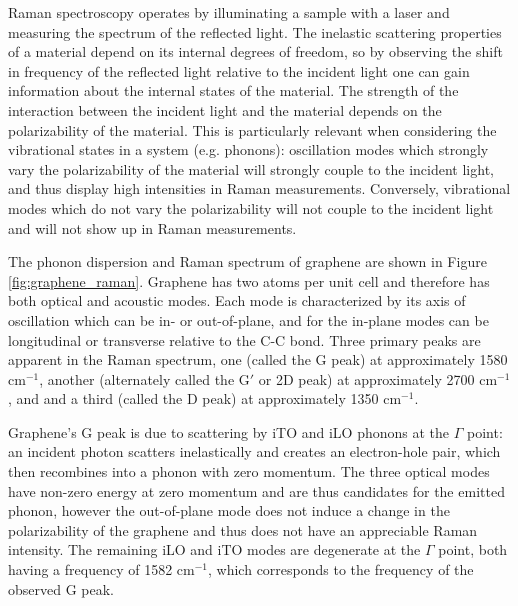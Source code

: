 \documentclass[edeposit,fullpage,draftthesis]{uiucthesis2009}
\begin{document}
        Raman spectroscopy operates by illuminating a sample with a laser and measuring the spectrum
        of the reflected light. The inelastic scattering properties of a material depend on its
        internal degrees of freedom, so by 
        observing the shift in frequency of the reflected light relative to the incident light one can
        gain information about the internal states of the material. 
        The strength of the interaction between the incident light and the material depends on the polarizability
        of the material. This is particularly relevant when considering the vibrational states in 
        a system (e.g. phonons): oscillation modes which strongly vary the polarizability of the material
        will strongly couple to the incident light, and thus display high intensities in Raman measurements.
        Conversely, vibrational modes which do not vary the polarizability will not couple to the incident
        light and will not show up in Raman measurements.
        
        The phonon dispersion and Raman spectrum of graphene are shown in Figure \ref{fig:graphene_raman}. 
        Graphene has two atoms per unit cell and therefore has both optical and acoustic modes. Each mode
        is characterized by its axis of oscillation which can be in- or out-of-plane, and for the in-plane 
        modes can be longitudinal or transverse relative to the C-C bond.
        Three primary peaks are apparent in the Raman spectrum,
        one (called the G peak) at approximately 1580 cm$^{-1}$, 
        another (alternately called the G$'$ or 2D peak) at approximately 2700 cm$^{-1}$, and
        and a third (called the D peak) at approximately 1350 cm$^{-1}$. 
       
        Graphene's G peak is due to scattering by iTO and iLO phonons at the $\Gamma$ point: an incident photon
        scatters inelastically and creates an electron-hole pair, which then recombines into a phonon
        with zero momentum. The three optical modes have non-zero energy at zero momentum and are thus 
        candidates for the emitted phonon, however the out-of-plane mode does not induce a change in the 
        polarizability of the graphene and thus does not have an appreciable Raman intensity. The
        remaining iLO and iTO modes are degenerate at the $\Gamma$ point, both having a frequency of
        1582 cm$^{-1}$, which corresponds to the frequency of the observed G peak.
                   
\end{document}
